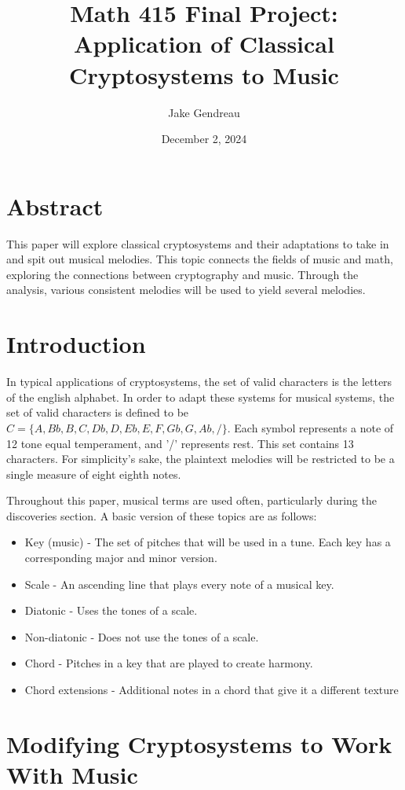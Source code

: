 \documentclass[14pt]{article}
\title{Math 415 Final Project: Application of Classical Cryptosystems to Music}
\author{Jake Gendreau}
\date{December 2, 2024}
\begin{document}
	\maketitle

	\tableofcontents

	\section{Abstract}
    This paper will explore classical cryptosystems and their adaptations to take in and spit out musical melodies. This topic connects the fields of music and math, exploring the connections between cryptography and music. Through the analysis, various consistent melodies will be used to yield several melodies.

	\section{Introduction}
    In typical applications of cryptosystems, the set of valid characters is the letters of the english alphabet. In order to adapt these systems for musical systems, the set of valid characters is defined to be $C = \{A, Bb, B, C, Db, D, Eb, E, F, Gb, G, Ab, /\}$. Each symbol represents a note of 12 tone equal temperament, and '/' represents rest. This set contains 13 characters. For simplicity's sake, the plaintext melodies will be restricted to be a single measure of eight eighth notes.

    Throughout this paper, musical terms are used often, particularly during the discoveries section. A basic version of these topics are as follows:
    \begin{itemize}
        \item Key (music) - The set of pitches that will be used in a tune. Each key has a corresponding major and minor version.
        \item Scale - An ascending line that plays every note of a musical key.
        \item Diatonic - Uses the tones of a scale.
        \item Non-diatonic - Does not use the tones of a scale.
        \item Chord - Pitches in a key that are played to create harmony.
        \item Chord extensions - Additional notes in a chord that give it a different texture
    \end{itemize}

	\section{Modifying Cryptosystems to Work With Music}
\end{document}
